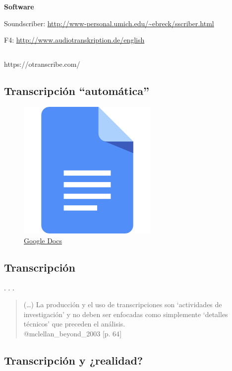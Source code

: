 \textbf{Software}

Soundscriber: \url{http://www-personal.umich.edu/~ebreck/sscriber.html}

F4: \url{http://www.audiotranskription.de/english}

\hypertarget{section}{%
\subsection{}\label{section}}

https://otranscribe.com/

\hypertarget{transcripciuxf3n-automuxe1tica}{%
\subsection{Transcripción
``automática''}\label{transcripciuxf3n-automuxe1tica}}

\begin{figure}
\centering
\includegraphics{imagenes-cuali/docs.png}
\caption{\href{https://docs.google.com/document/u/0/}{Google Docs}}
\end{figure}

\hypertarget{transcripcion}{%
\subsection{Transcripción}\label{transcripcion}}

. . .

\begin{quote}
(\ldots{}) La producción y el uso de transcripciones son {`actividades
de investigación'} y no deben ser enfocadas como simplemente `detalles
técnicos' que preceden el análisis.\\
@mclellan\_beyond\_2003 {[}p. 64{]}
\end{quote}

\hypertarget{transcripcion-realidad}{%
\subsection{Transcripción y ¿realidad?}\label{transcripcion-realidad}}


